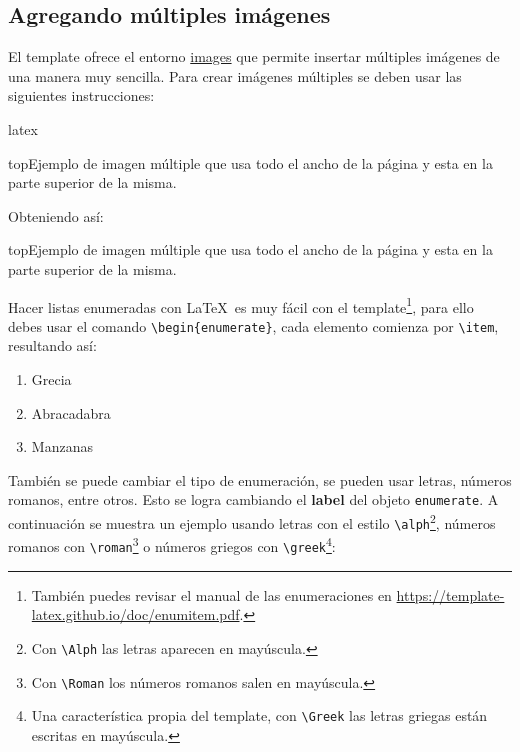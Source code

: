 \subsection{Agregando múltiples imágenes}

	El template ofrece el entorno \href{https://template-latex.github.io/informe.html#hlp-images}{images} que permite insertar múltiples imágenes de una manera muy sencilla. Para crear imágenes múltiples se deben usar las siguientes instrucciones:

\begin{sourcecode}{latex}{}
\begin{imagesmc}{top}{Ejemplo de imagen múltiple que usa todo el ancho de la página y esta en la parte superior de la misma.}
\end{imagesmc}
\end{sourcecode}

	Obteniendo así:

	\begin{imagesmc}{top}{Ejemplo de imagen múltiple que usa todo el ancho de la página y esta en la parte superior de la misma.}
	\end{imagesmc}




	Hacer listas enumeradas con \LaTeX\ es muy fácil con el template\footnote{También puedes revisar el manual de las enumeraciones en \url{https://template-latex.github.io/doc/enumitem.pdf}.}, para ello debes usar el comando \texttt{\textbackslash begin\{enumerate\}}, cada elemento comienza por \texttt{\textbackslash item}, resultando así:

	\begin{enumerate}
		\item Grecia
		\item Abracadabra
		\item Manzanas
	\end{enumerate}

	También se puede cambiar el tipo de enumeración, se pueden usar letras, números romanos, entre otros. Esto se logra cambiando el \textbf{label} del objeto \texttt{enumerate}. A continuación se muestra un ejemplo usando letras con el estilo \texttt{\textbackslash alph}\footnote{Con \texttt{\textbackslash Alph} las letras aparecen en mayúscula.}, números romanos con \texttt{\textbackslash roman}\footnote{Con \texttt{\textbackslash Roman} los números romanos salen en mayúscula.} o números griegos con \texttt{\textbackslash greek}\footnote{Una característica propia del template, con \texttt{\textbackslash Greek} las letras griegas están escritas en mayúscula.}:

